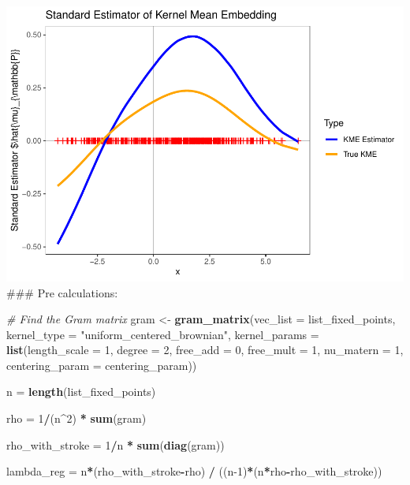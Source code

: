\documentclass[
]{article}
\newenvironment{Shaded}{\begin{snugshade}}{\end{snugshade}}
\newcommand{\AttributeTok}[1]{\textcolor[rgb]{0.13,0.29,0.53}{#1}}
\newcommand{\CommentTok}[1]{\textcolor[rgb]{0.56,0.35,0.01}{\textit{#1}}}
\newcommand{\DecValTok}[1]{\textcolor[rgb]{0.00,0.00,0.81}{#1}}
\newcommand{\FunctionTok}[1]{\textcolor[rgb]{0.13,0.29,0.53}{\textbf{#1}}}
\newcommand{\NormalTok}[1]{#1}
\newcommand{\OtherTok}[1]{\textcolor[rgb]{0.56,0.35,0.01}{#1}}
\newcommand{\SpecialCharTok}[1]{\textcolor[rgb]{0.81,0.36,0.00}{\textbf{#1}}}
\newcommand{\StringTok}[1]{\textcolor[rgb]{0.31,0.60,0.02}{#1}}
\begin{document}
\includegraphics{direct_approach_kef_Brownian_kernel_files/figure-latex/unnamed-chunk-8-1.pdf}
\#\#\# Pre calculations:

\begin{Shaded}
\begin{Highlighting}[]
\CommentTok{\# Find the Gram matrix}
\NormalTok{gram }\OtherTok{\textless{}{-}} \FunctionTok{gram\_matrix}\NormalTok{(}\AttributeTok{vec\_list =}\NormalTok{ list\_fixed\_points, }
                    \AttributeTok{kernel\_type =} \StringTok{"uniform\_centered\_brownian"}\NormalTok{,}
                    \AttributeTok{kernel\_params =} \FunctionTok{list}\NormalTok{(}\AttributeTok{length\_scale =} \DecValTok{1}\NormalTok{, }\AttributeTok{degree =} \DecValTok{2}\NormalTok{,}
                                             \AttributeTok{free\_add =} \DecValTok{0}\NormalTok{, }\AttributeTok{free\_mult =} \DecValTok{1}\NormalTok{,}
                                             \AttributeTok{nu\_matern =} \DecValTok{1}\NormalTok{, }\AttributeTok{centering\_param =}\NormalTok{ centering\_param))}

\NormalTok{n }\OtherTok{=} \FunctionTok{length}\NormalTok{(list\_fixed\_points)}

\NormalTok{rho }\OtherTok{=} \DecValTok{1}\SpecialCharTok{/}\NormalTok{(n}\SpecialCharTok{\^{}}\DecValTok{2}\NormalTok{) }\SpecialCharTok{*} \FunctionTok{sum}\NormalTok{(gram)}

\NormalTok{rho\_with\_stroke }\OtherTok{=} \DecValTok{1}\SpecialCharTok{/}\NormalTok{n }\SpecialCharTok{*} \FunctionTok{sum}\NormalTok{(}\FunctionTok{diag}\NormalTok{(gram))}

\NormalTok{lambda\_reg }\OtherTok{=}\NormalTok{ n}\SpecialCharTok{*}\NormalTok{(rho\_with\_stroke}\SpecialCharTok{{-}}\NormalTok{rho) }\SpecialCharTok{/}\NormalTok{ ((n}\DecValTok{{-}1}\NormalTok{)}\SpecialCharTok{*}\NormalTok{(n}\SpecialCharTok{*}\NormalTok{rho}\SpecialCharTok{{-}}\NormalTok{rho\_with\_stroke))}
\end{Highlighting}
\end{Shaded}
\end{document}
